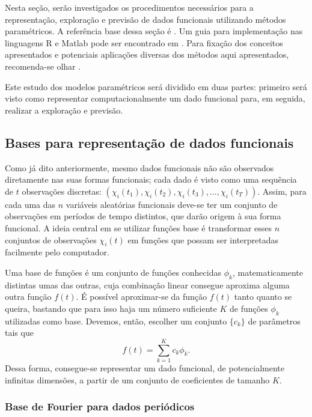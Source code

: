 \documentclass[
	12pt,				%
	openright,			%
	oneside,			%
	a4paper,			%
	english,			%
	brazil				%
	]{dissertacao-ufrgs-abntex2}
\begin{document}
Nesta seção, serão investigados os procedimentos necessários para
a representação, exploração e previsão de dados funcionais utilizando
métodos paramétricos. A referência base dessa seção é .
Um guia para implementação nas linguagens R e Matlab pode ser encontrado
em . Para fixação dos conceitos apresentados e potenciais
aplicações diversas dos métodos aqui apresentados, recomenda-se olhar
. 

Este estudo dos modelos paramétricos será dividido em duas partes:
primeiro será visto como representar computacionalmente um dado funcional
para, em seguida, realizar a exploração e previsão.


\subsection{Bases para representação
de dados funcionais} %

Como já dito anteriormente, mesmo dados funcionais não são observados
diretamente nas suas formas funcionais; cada dado é visto como uma
sequência de $t$ observações discretas: $(\chi_{i}(t_{1}),\chi_{i}(t_{2}),\chi_{i}(t_{3}),...,\chi_{i}(t_{T}))$.
Assim, para cada uma das $n$ variáveis aleatórias funcionais deve-se
ter um conjunto de observações em períodos de tempo distintos, que
darão origem à sua forma funcional. A ideia central em se utilizar
funções base é transformar esses $n$ conjuntos de observações $\chi_{i}(t)$
em funções que possam ser interpretadas facilmente pelo computador.

Uma base de funções é um conjunto de funções conhecidas $\phi_{k}$,
matematicamente distintas umas das outras, cuja combinação linear
consegue aproxima alguma outra função $f(t)$. É possível aproximar-se da função $f(t)$ tanto quanto se queira, bastando que
para isso haja um número suficiente $K$ de funções $\phi_{k}$ utilizadas 
como base. Devemos, então, escolher um conjunto $\{c_{k}\}$ de parâmetros tais que
\begin{equation}
f(t)=\sum_{k=1}^{K}c_{k}\phi_{k}.
\end{equation}
Dessa forma, consegue-se representar um dado funcional, de potencialmente
infinitas dimensões, a partir de um conjunto de coeficientes de tamanho
$K$. 

\subsubsection*{Base de Fourier para dados periódicos}
\end{document}
